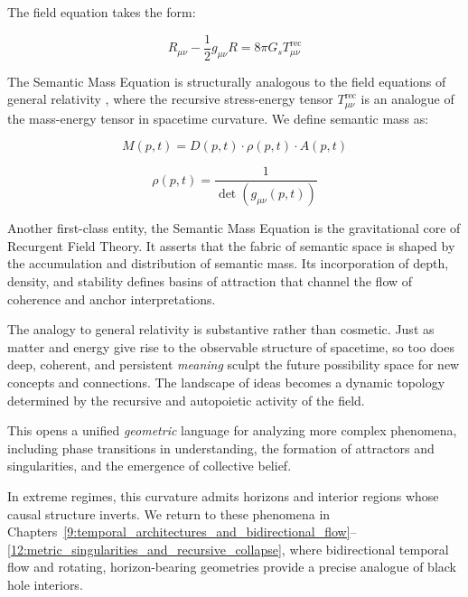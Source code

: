 The field equation takes the form:

\begin{equation}
R_{\mu\nu} - \frac{1}{2}g_{\mu\nu}R = 8\pi G_s T^{\text{rec}}_{\mu\nu}
\end{equation}

The Semantic Mass Equation is structurally analogous to the field equations of general relativity \autocite{Einstein1915, MisnerThorneWheeler1973, Wald1984}, where the recursive stress-energy tensor \(T^{\text{rec}}_{\mu\nu}\) is an analogue of the mass-energy tensor in spacetime curvature. We define semantic mass as:

\begin{equation}
M(p,t) = D(p,t) \cdot \rho(p,t) \cdot A(p,t)
\end{equation}

\begin{equation}
\rho(p,t) = \frac{1}{\det(g_{\mu\nu}(p,t))}
\end{equation}

Another first-class entity, the Semantic Mass Equation is the gravitational core of Recurgent Field Theory. It asserts that the fabric of semantic space is shaped by the accumulation and distribution of semantic mass. Its incorporation of depth, density, and stability defines basins of attraction that channel the flow of coherence and anchor interpretations.

The analogy to general relativity is substantive rather than cosmetic. Just as matter and energy give rise to the observable structure of spacetime, so too does deep, coherent, and persistent \textit{meaning} sculpt the future possibility space for new concepts and connections. The landscape of ideas becomes a dynamic topology determined by the recursive and autopoietic activity of the field.

This opens a unified \textit{geometric} language for analyzing more complex phenomena, including phase transitions in understanding, the formation of attractors and singularities, and the emergence of collective belief.

In extreme regimes, this curvature admits horizons and interior regions whose causal structure inverts. We return to these phenomena in Chapters~\ref{9:temporal_architectures_and_bidirectional_flow}--\ref{12:metric_singularities_and_recursive_collapse}, where bidirectional temporal flow and rotating, horizon-bearing geometries provide a precise analogue of black hole interiors.


